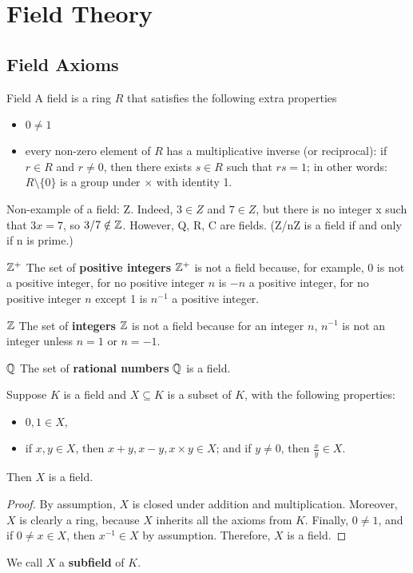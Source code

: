 \chapter{Field Theory}
\section{Field Axioms}
\begin{defn}{Field}{}
A field is a ring $R$ that satisfies the following extra properties
\begin{itemize}
\item $0 \neq 1$
\item every non-zero element of $R$ has a multiplicative inverse (or reciprocal): if $r \in R$ and $r \neq 0$, then there exists $s \in R$ such that $rs=1$; in other words: $R \setminus\{0\}$ is a group under $\times$ with identity 1.
\end{itemize}
\end{defn}

Non-example of a field: Z. Indeed, $3 \in Z$ and $7 \in Z$, but there is no integer x such that $3x = 7$, so $3/7 \notin \mathbb Z$.
However, Q, R, C are fields. (Z/nZ is a field if and only if n is prime.)

\begin{exmp}{$\mathbb Z^+$}{}
The set of \textbf{positive integers} $\mathbb Z^+$ is not a field because, for example, 0 is not a positive integer, for no positive integer $n$ is $-n$ a positive integer, for no positive integer $n$ except 1 is $n^{-1}$ a positive integer.
\end{exmp}

\begin{exmp}{$\mathbb Z$}{}
The set of \textbf{integers} $\mathbb Z$ is not a field because for an integer $n$, $n^{-1}$ is not an integer unless $n=1$ or $n=-1$.
\end{exmp}

\begin{exmp}{$\mathbb Q$}{}
The set of \textbf{rational numbers} $\mathbb Q$ is a field.
\end{exmp}

\begin{proposition}
Suppose $K$ is a field and $X \subseteq K$ is a subset of $K$, with the following properties:
\begin{itemize}
\item $0, 1 \in X$,
\item if $x, y \in X$, then $x+y, x-y, x \times y \in X$; and if $y \neq 0$, then $\frac{x}{y} \in X$.
\end{itemize}
Then $X$ is a field.
\end{proposition}
\begin{proof}
By assumption, $X$ is closed under addition and multiplication. Moreover, $X$ is clearly a ring, because $X$ inherits all the axioms from $K$. Finally, $0 \neq 1$, and if $0 \neq x \in X$, then $x^{-1} \in X$ by assumption. Therefore, $X$ is a field.
\end{proof}
We call $X$ a \textbf{subfield} of $K$.

